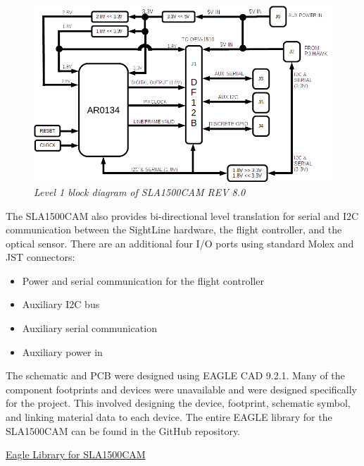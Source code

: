 \documentclass[11pt]{article}
\begin{document}
    \begin{figure}[H]
	\centering	
	\includegraphics[width=6 in]{LEVEL1_DIAGRAM_SCHEM_V2}
	\caption{\textit{Level 1 block diagram of SLA1500CAM REV 8.0}}	
	\end{figure}

The SLA1500CAM also provides bi-directional level translation for serial and I2C communication between the SightLine hardware, the flight controller, and the optical sensor. There are an additional four I/O ports using standard Molex and JST connectors: 

\begin{itemize}

\item Power and serial communication for the flight controller
\item Auxiliary I2C bus
\item Auxiliary serial communication
\item Auxiliary power in 

\end{itemize}

The schematic and PCB were designed using EAGLE CAD 9.2.1. Many of the component footprints and devices were unavailable and were designed specifically for the project. This involved designing the device, footprint, schematic symbol, and linking material data to each device. The entire EAGLE library for the SLA1500CAM can be found in the GitHub repository.

\href{https://github.com/phamtaiece/Capstone-Sightline/tree/master/EAGLE\%20files/Library}{Eagle Library for SLA1500CAM}
\end{document}
